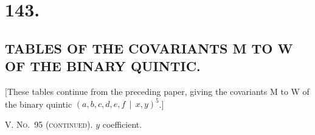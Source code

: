 \documentclass[11pt,a4paper]{article}
\begin{document}
\setlength{\parindent}{1.5em}
\setlength{\parskip}{0pt plus 1pt}


\clearpage
\section*{143.}
\subsection*{TABLES OF THE COVARIANTS M TO W OF THE BINARY QUINTIC.}

[These tables continue from the preceding paper, giving the covariants M to W
of the binary quintic $(a, b, c, d, e, f \, \mid\, x, y)^5$.]

\bigskip
\noindent\textsc{V. No.~95 (continued).} $y$ coefficient.
\end{document}
